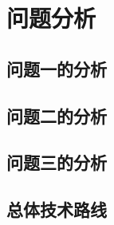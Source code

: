 \section{问题分析}


\subsection{问题一的分析}

\subsection{问题二的分析}

\subsection{问题三的分析}

\subsection{总体技术路线}

